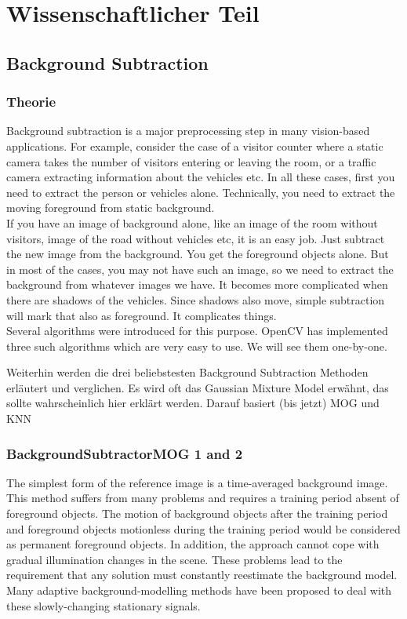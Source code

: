 \chapter{Wissenschaftlicher Teil}
\section{Background Subtraction}
\subsection{Theorie}
Background subtraction is a major preprocessing step in many vision-based applications. For example, consider the case of a visitor counter where a static camera takes the number of visitors entering or leaving the room, or a traffic camera extracting information about the vehicles etc. In all these cases, first you need to extract the person or vehicles alone. Technically, you need to extract the moving foreground from static background. \\
If you have an image of background alone, like an image of the room without visitors, image of the road without vehicles etc, it is an easy job. Just subtract the new image from the background. You get the foreground objects alone. But in most of the cases, you may not have such an image, so we need to extract the background from whatever images we have. It becomes more complicated when there are shadows of the vehicles. Since shadows also move, simple subtraction will mark that also as foreground. It complicates things. \\
Several algorithms were introduced for this purpose. OpenCV has implemented three such algorithms which are very easy to use. We will see them one-by-one.

Weiterhin werden die drei beliebstesten Background Subtraction Methoden erläutert und verglichen. Es wird oft das Gaussian Mixture Model erwähnt, das sollte wahrscheinlich hier erklärt werden. Darauf basiert (bis jetzt) MOG und KNN
\subsection{BackgroundSubtractorMOG 1 and 2}
The simplest form of the reference image is a time-averaged background image. This method suffers from many problems and requires a training period absent of foreground objects. The motion of background objects after the training period and foreground objects motionless during the training period would be considered as permanent foreground objects. In addition, the approach cannot cope with gradual illumination changes in the scene. These problems lead to the requirement that any solution must constantly reestimate the background model. Many adaptive background-modelling methods have been proposed to deal with these slowly-changing stationary signals.

